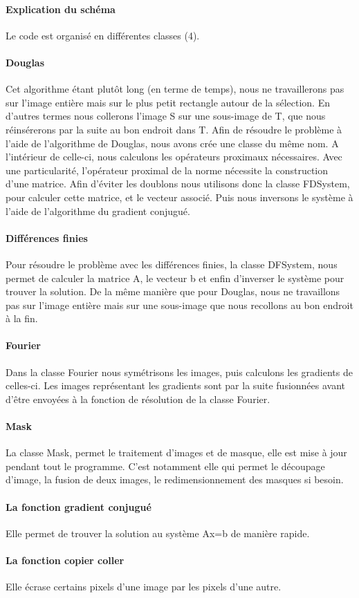 \paragraph{Explication du schéma}
Le code est organisé en différentes classes (4).
\paragraph{Douglas}
Cet algorithme étant plutôt long (en terme de temps), nous ne travaillerons pas sur l'image entière mais sur le plus petit rectangle autour de la sélection. En d'autres termes nous collerons l'image S sur une sous-image de T, que nous réinsérerons par la suite au bon endroit dans T. Afin de résoudre le problème à l'aide de l'algorithme de Douglas, nous avons crée une classe du même nom.  A l'intérieur de celle-ci, nous calculons les opérateurs proximaux nécessaires. Avec une particularité, l'opérateur proximal de la norme nécessite la construction d'une matrice. Afin d'éviter les doublons nous utilisons donc la classe FDSystem, pour calculer cette matrice, et le vecteur associé. Puis nous inversons le système à l'aide de l'algorithme du gradient conjugué. 
\paragraph{Différences finies}
Pour résoudre le problème avec les différences finies, la classe DFSystem, nous permet de calculer la matrice A, le vecteur b et enfin d'inverser le système pour trouver la solution. De la même manière que pour Douglas, nous ne travaillons pas sur l'image entière mais sur une sous-image que nous recollons au bon endroit à la fin.
\paragraph{Fourier}
Dans la classe Fourier nous symétrisons les images, puis calculons les gradients de celles-ci. Les images représentant les gradients sont par la suite fusionnées avant d'être envoyées à la fonction de résolution de la classe Fourier. 
\paragraph{Mask}
La classe Mask, permet le traitement d'images et de masque, elle est mise à jour pendant tout le programme. C'est notamment elle qui permet le découpage d'image, la fusion de deux images, le redimensionnement des masques si besoin. 
\paragraph{La fonction gradient conjugué}
Elle permet de trouver la solution au système Ax=b de manière rapide.
\paragraph{La fonction copier coller} 
Elle écrase certains pixels d'une image par les pixels d'une autre.